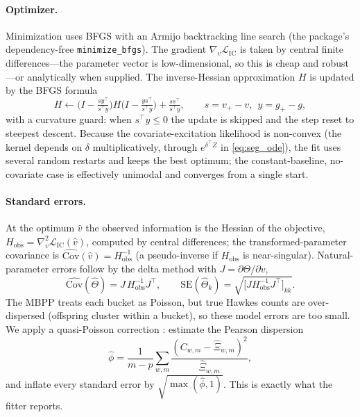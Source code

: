 \documentclass[11pt]{article}
\theoremstyle{plain}
\theoremstyle{definition}
\theoremstyle{remark}
\newcommand{\cL}{\mathcal{L}}
\newcommand{\code}[1]{\texttt{#1}}
\begin{document}
\paragraph{Optimizer.}
Minimization uses BFGS with an Armijo backtracking line search (the package's dependency-free \code{minimize\_bfgs}). The gradient $\nabla_v\cL_{\mathrm{IC}}$ is taken by central finite differences---the parameter vector is low-dimensional, so this is cheap and robust---or analytically when supplied. The inverse-Hessian approximation $H$ is updated by the BFGS formula
\[
H\leftarrow\Big(I-\tfrac{s y^\top}{s^\top y}\Big)H\Big(I-\tfrac{y s^\top}{s^\top y}\Big)+\tfrac{s s^\top}{s^\top y},\qquad s=v_{+}-v,\ \ y=g_{+}-g,
\]
with a curvature guard: when $s^\top y\le0$ the update is skipped and the step reset to steepest descent. Because the covariate-excitation likelihood is non-convex (the kernel depends on $\delta$ multiplicatively, through $e^{\delta^\top Z}$ in \eqref{eq:seg_ode}), the fit uses several random restarts and keeps the best optimum; the constant-baseline, no-covariate case is effectively unimodal and converges from a single start.

\paragraph{Standard errors.}
At the optimum $\widehat v$ the observed information is the Hessian of the objective, $H_{\mathrm{obs}}=\nabla^2_v\cL_{\mathrm{IC}}(\widehat v)$, computed by central differences; the transformed-parameter covariance is $\widehat{\mathrm{Cov}}(\widehat v)=H_{\mathrm{obs}}^{-1}$ (a pseudo-inverse if $H_{\mathrm{obs}}$ is near-singular). Natural-parameter errors follow by the delta method with $J=\partial\Theta/\partial v$,
\begin{equation}
\widehat{\mathrm{Cov}}(\widehat\Theta)=J\,H_{\mathrm{obs}}^{-1}J^\top,\qquad
\mathrm{SE}(\widehat\Theta_k)=\sqrt{\big[J H_{\mathrm{obs}}^{-1}J^\top\big]_{kk}}.
\label{eq:delta_se}
\end{equation}
The MBPP treats each bucket as Poisson, but true Hawkes counts are over-dispersed (offspring cluster within a bucket), so these model errors are too small. We apply a quasi-Poisson correction \citep{wedderburn1974}: estimate the Pearson dispersion
\begin{equation}
\widehat\phi=\frac{1}{m-p}\sum_{w,m}\frac{(C_{w,m}-\widehat\Xi_{w,m})^2}{\widehat\Xi_{w,m}},
\label{eq:dispersion}
\end{equation}
and inflate every standard error by $\sqrt{\max(\widehat\phi,1)}$. This is exactly what the fitter reports.
\end{document}
